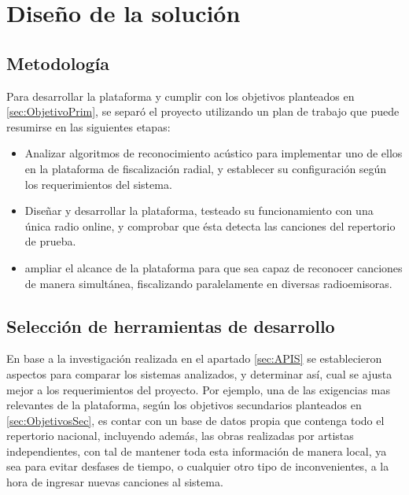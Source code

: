 
\chapter{Diseño de la solución}

\section{Metodología}



Para desarrollar la plataforma y cumplir con los objetivos planteados en \ref{sec:ObjetivoPrim}, se separó el proyecto utilizando un plan de trabajo que puede resumirse en las siguientes etapas:

\begin{itemize}
\item Analizar algoritmos de reconocimiento acústico para implementar uno de ellos en la plataforma de fiscalización radial, y establecer su configuración según los requerimientos del sistema.

\item Diseñar y desarrollar la plataforma, testeado su funcionamiento con una única radio online, y comprobar que ésta detecta las canciones del repertorio de prueba.

\item ampliar el alcance de la plataforma para que sea capaz de reconocer canciones de manera simultánea, fiscalizando paralelamente en diversas radioemisoras.
\end{itemize}

\section{Selección de herramientas de desarrollo}

En base a la investigación realizada en el apartado \ref{sec:APIS} se establecieron \NumElemTablaComparativaAPIS{} aspectos para comparar los sistemas analizados, y determinar así, cual se ajusta mejor a los requerimientos del proyecto. Por ejemplo, una de las exigencias mas relevantes de la plataforma, según los objetivos secundarios planteados en \ref{sec:ObjetivosSec}, es contar con un base de datos propia que contenga todo el repertorio nacional, incluyendo además, las obras realizadas por artistas independientes, con tal de mantener toda esta información de manera local, ya sea para evitar desfases de tiempo, o cualquier otro tipo de inconvenientes, a la hora de ingresar nuevas canciones al sistema.

